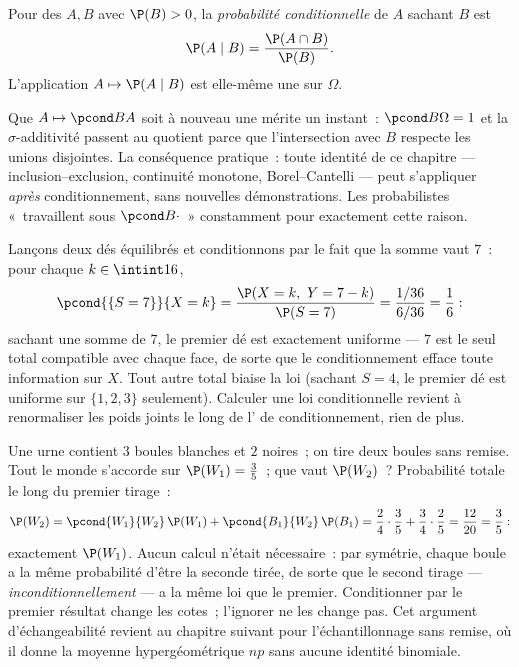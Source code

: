 \begin{definition}\label{def:b2:proba:conditional}
Pour des  $A, B$ avec $\P(B) > 0$, la \emph{probabilité
conditionnelle} de $A$ sachant $B$ est
\[
\P(A \mid B) = \frac{\P(A \cap B)}{\P(B)} .
\]
L'application $A \mapsto \P(A \mid B)$ est elle-même une  sur $\Omega$.
\end{definition}

\begin{remark}
Que $A \mapsto \pcond BA$ soit à nouveau une 
mérite un instant~: $\pcond B\Omega = 1$ et la $\sigma$-additivité
passent au quotient parce que l'intersection avec $B$
respecte les unions disjointes. La conséquence pratique~: toute
identité de ce chapitre --- inclusion--exclusion, continuité
monotone, Borel--Cantelli --- peut s'appliquer \emph{après}
conditionnement, sans nouvelles démonstrations. Les probabilistes
«~travaillent sous $\pcond B{\cdot}$~» constamment pour exactement cette
raison.
\end{remark}

\begin{example}\label{ex:b2:proba:sumseven}
Lançons deux dés équilibrés et conditionnons par le fait que la somme
vaut $7$~: pour chaque $k \in \intint16$,
\[
\pcond{\{S = 7\}}{X = k}
= \frac{\P(X = k,\ Y = 7 - k)}{\P(S = 7)}
= \frac{1/36}{6/36} = \frac16 :
\]
sachant une somme de $7$, le premier dé est exactement uniforme ---
$7$ est le seul total compatible avec chaque face, de sorte que le
conditionnement efface toute information sur $X$. Tout autre total
biaise la loi (sachant $S = 4$, le premier dé est uniforme
sur $\{1, 2, 3\}$ seulement). Calculer une loi conditionnelle revient à
renormaliser les poids joints le long de l' de
conditionnement, rien de plus.
\end{example}

\begin{example}\label{ex:b2:proba:seconddraw}
Une urne contient $3$ boules blanches et $2$ noires~; on tire deux boules
sans remise. Tout le monde s'accorde sur $\P(W_1) = \frac35$~; que vaut
$\P(W_2)$~? Probabilité totale le long du premier tirage~:
\[
\P(W_2) = \pcond{W_1}{W_2}\,\P(W_1) +
\pcond{B_1}{W_2}\,\P(B_1)
= \frac24\cdot\frac35 + \frac34\cdot\frac25
= \frac{12}{20} = \frac35 :
\]
exactement $\P(W_1)$. Aucun calcul n'était nécessaire~: par symétrie,
chaque boule a la même probabilité d'être la seconde tirée, de sorte que
le second tirage --- \emph{inconditionnellement} --- a la même
loi que le premier. Conditionner par le premier résultat change
les cotes~; l'ignorer ne les change pas. Cet argument
d'échangeabilité revient au chapitre suivant pour l'échantillonnage sans
remise, où il donne la moyenne hypergéométrique $np$
sans aucune identité binomiale.
\end{example}

